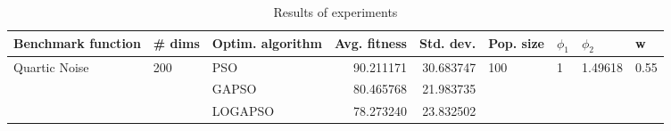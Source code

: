 \begin{table}
\centering
\caption{Results of experiments}
\begin{tabular}{lllrrllll}
\toprule
            Benchmark function &              \# dims & Optim. algorithm &  Avg. fitness &  Std. dev. &            Pop. size &         $\phi_{1}$ &               $\phi_{2}$ &                     w \\
\midrule
\multirow{3}{*}{Quartic Noise} & \multirow{3}{*}{200} &              PSO &     90.211171 &  30.683747 & \multirow{3}{*}{100} & \multirow{3}{*}{1} & \multirow{3}{*}{1.49618} & \multirow{3}{*}{0.55} \\
                               &                      &            GAPSO &     80.465768 &  21.983735 &                      &                    &                          &                       \\
                               &                      &          LOGAPSO &     78.273240 &  23.832502 &                      &                    &                          &                       \\
\bottomrule
\end{tabular}
\end{table}
